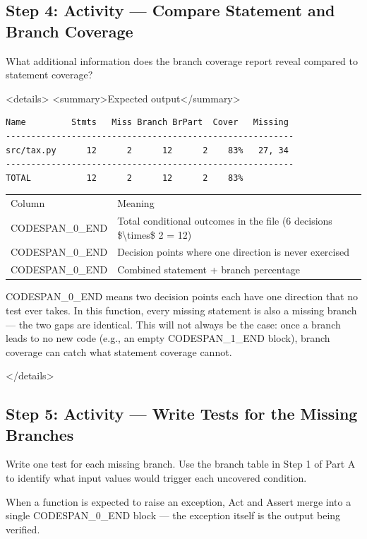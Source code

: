 \documentclass[11pt,a4paper]{book}
\begin{document}
\medskip

\subsection{Step 4: Activity --- Compare Statement and Branch Coverage}

What additional information does the branch coverage report reveal compared to statement coverage?

<details>
<summary>Expected output</summary>

\begin{lstlisting}
Name         Stmts   Miss Branch BrPart  Cover   Missing
---------------------------------------------------------
src/tax.py      12      2      12      2    83%   27, 34
---------------------------------------------------------
TOTAL           12      2      12      2    83%
\end{lstlisting}

\begin{tabular}{ll}
\hline
Column & Meaning \\
CODESPAN\_0\_END & Total conditional outcomes in the file (6 decisions \$\textbackslash{}times\$ 2 = 12) \\
CODESPAN\_0\_END & Decision points where one direction is never exercised \\
CODESPAN\_0\_END & Combined statement + branch percentage \\
\hline
\end{tabular}

CODESPAN\_0\_END means two decision points each have one direction that no test ever takes. In this function, every missing statement is also a missing branch --- the two gaps are identical. This will not always be the case: once a branch leads to no new code (e.g., an empty CODESPAN\_1\_END block), branch coverage can catch what statement coverage cannot.

</details>

\medskip

\subsection{Step 5: Activity --- Write Tests for the Missing Branches}

Write one test for each missing branch. Use the branch table in Step 1 of Part A to identify what input values would trigger each uncovered condition.

When a function is expected to raise an exception, Act and Assert merge into a single CODESPAN\_0\_END block --- the exception itself is the output being verified.
\end{document}
